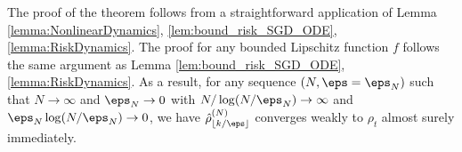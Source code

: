 \documentclass[11pt]{article}
\renewcommand{\eqref}[1]{(\ref{#1})}
\begin{document}
The proof of the theorem follows from a straightforward application of Lemma \ref{lemma:NonlinearDynamics}, \ref{lem:bound_risk_SGD_ODE}, \ref{lemma:RiskDynamics}. The proof for any bounded Lipschitz function $f$ follows the same argument as Lemma \ref{lem:bound_risk_SGD_ODE}, \ref{lemma:RiskDynamics}. As a result, for any sequence $(N, \eps = \eps_N)$ such that $N \to \infty$ and $\eps_N \to 0$ with $N / \log(N/\eps_N) \to \infty$ and $\eps_N \log (N /\eps_N) \to 0$, we have $\hat \rho_{\lfloor k/\eps\rfloor}^{(N)}$ converges weakly to $\rho_{t}$ almost surely immediately. 

%
%
%
%
%
%
%
%
%
%
\end{document}
